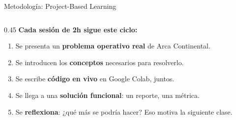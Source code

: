 \documentclass[aspectratio=169, 11pt]{beamer}
\begin{document}
\begin{frame}{Metodología: Project-Based Learning}
\begin{columns}[T]
    \begin{column}{0.45\textwidth}
      {\small\color{arcaDark}\bfseries Cada sesión de 2h sigue este ciclo:}

      \vspace{6pt}
      {\footnotesize
      \begin{enumerate}\setlength{\itemsep}{3pt}
        \item[\textbf{\color{arcaRed}1.}] Se presenta un \textbf{problema operativo real} de Arca Continental.

        \item[\textbf{\color{arcaRed}2.}] Se introducen los \textbf{conceptos} necesarios para resolverlo.

        \item[\textbf{\color{arcaRed}3.}] Se escribe \textbf{código en vivo} en Google Colab, juntos.

        \item[\textbf{\color{arcaRed}4.}] Se llega a una \textbf{solución funcional}: un reporte, una métrica.

        \item[\textbf{\color{arcaRed}5.}] Se \textbf{reflexiona}: ¿qué más se podría hacer? Eso motiva la siguiente clase.
      \end{enumerate}
      }

     
    \end{column}
  \end{columns}
\end{frame}
\end{document}
